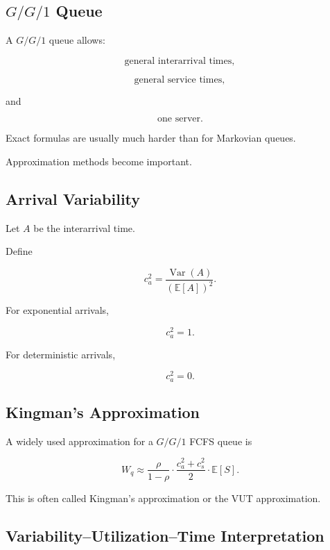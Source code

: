 \subsection{\(G/G/1\) Queue}
\label{subsec:gg1-queue}

A \(G/G/1\) queue allows:

\[
\boxed{
\text{general interarrival times},
}
\]

\[
\boxed{
\text{general service times},
}
\]

and

\[
\boxed{
\text{one server}.
}
\]

Exact formulas are usually much harder than for Markovian queues.

Approximation methods become important.

\subsection{Arrival Variability}
\label{subsec:arrival-variability}

Let \(A\) be the interarrival time.

Define

\[
\boxed{
c_a^2
=
\frac{
\operatorname{Var}(A)
}{
(
\mathbb{E}[A]
)^2
}.
}
\]

For exponential arrivals,

\[
\boxed{
c_a^2=1.
}
\]

For deterministic arrivals,

\[
\boxed{
c_a^2=0.
}
\]

\subsection{Kingman's Approximation}
\label{subsec:kingman-approximation}

A widely used approximation for a \(G/G/1\) FCFS queue is

\[
\boxed{
W_q
\approx
\frac{
\rho
}{
1-\rho
}
\cdot
\frac{
c_a^2+c_s^2
}{
2
}
\cdot
\mathbb{E}[S].
}
\]

This is often called Kingman's approximation or the VUT approximation.

\subsection{Variability--Utilization--Time Interpretation}
\label{subsec:vut-interpretation}

